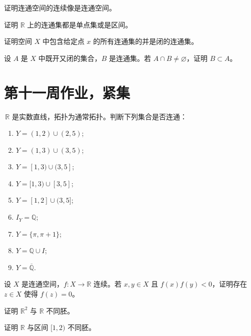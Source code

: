 \begin{homework}[2]
证明连通空间的连续像是连通空间。
\end{homework}

\begin{homework}[3]
证明 $\mathbb{R}$ 上的连通集都是单点集或是区间。
\end{homework}

\begin{homework}[4.1]
证明空间 $X$ 中包含给定点 $x$ 的所有连通集的并是闭的连通集。
\end{homework}

\begin{homework}[4.4]
设 $A$ 是 $X$ 中既开又闭的集合，$B$ 是连通集。若 $A\cap B\neq\varnothing$，证明 $B\subset A$。
\end{homework}

\section{第十一周作业，紧集}

\begin{homework}[4.5]
$\,\mathbb R$ 是实数直线，拓扑为通常拓扑。判断下列集合是否连通：
\begin{enumerate}
    \item $Y=(1,2)\cup(2,5)$;
    \item $Y=(1,3)\cup(3,5)$;
    \item $Y=[1,3)\cup(3,5]$;
    \item $Y=[1,3)\cup[3,5]$;
    \item $Y=[1,2]\cup(3,5]$;
    \item $I_Y=\mathbb Q$;
    \item $Y=\{\pi,\pi+1\}$;
    \item $Y=\mathbb Q\cup I$;
    \item $Y=\overline{\mathbb Q}$.
\end{enumerate}
\end{homework}

\begin{homework}[4.6]
设 $X$ 是连通空间，$f:X\to\mathbb R$ 连续。若 $x,y\in X$ 且 $f(x)f(y)<0$，证明存在 $z\in X$ 使得 $f(z)=0$。
\end{homework}

\begin{homework}[4.7]
证明 $\mathbb{R}^2$ 与 $\mathbb{R}$ 不同胚。
\end{homework}

\begin{homework}[4.8]
证明 $\mathbb{R}$ 与区间 $[1,2)$ 不同胚。
\end{homework}

